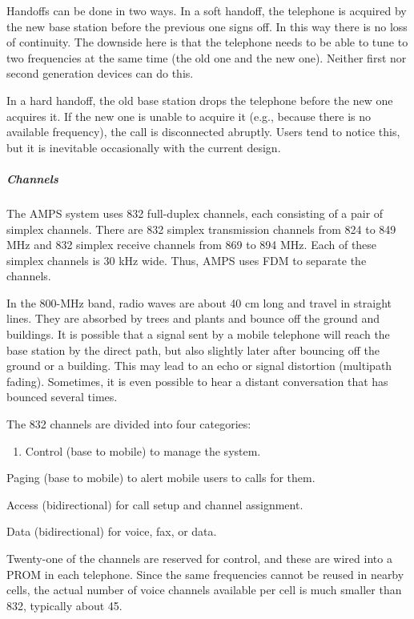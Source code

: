 Handoffs can be done in two ways. In a {soft handoff}, the telephone is
acquired by the new base station before the previous one signs off. In
this way there is no loss of continuity. The downside here is that the
telephone needs to be able to tune to two frequencies at the same time
(the old one and the new one). Neither first nor second generation
devices can do this.

In a {hard handoff}, the old base station drops the telephone before the
new one acquires it. If the new one is unable to acquire it (e.g.,
because there is no available frequency), the call is disconnected
abruptly. Users tend to notice this, but it is inevitable occasionally
with the current design.

\protect\hypertarget{0130661023_ch02lev1sec6.htmlux5cux23ch02lev3sec20}{}{}

\subparagraph{Channels}

The AMPS system uses 832 full-duplex channels, each consisting of a pair
of simplex channels. There are 832 simplex transmission channels from
824 to 849 MHz and 832 simplex receive channels from 869 to 894 MHz.
Each of these simplex channels is 30 kHz wide. Thus, AMPS uses FDM to
separate the channels.

In the 800-MHz band, radio waves are about 40 cm long and travel in
straight lines. They are absorbed by trees and plants and bounce off the
ground and buildings. It is possible that a signal sent by a mobile
telephone will reach the base station by the direct path, but also
slightly later after bouncing off the ground or a building. This may
lead to an echo or signal distortion (multipath fading). Sometimes, it
is even possible to hear a distant conversation that has bounced several
times.

The 832 channels are divided into four categories:

\begin{enumerate}
\def\labelenumi{\arabic{enumi}.}
\item
  {}

  Control (base to mobile) to manage the system.
\end{enumerate}

Paging (base to mobile) to alert mobile users to calls for them.

Access (bidirectional) for call setup and channel assignment.

Data (bidirectional) for voice, fax, or data.

Twenty-one of the channels are reserved for control, and these are wired
into a PROM in each telephone. Since the same frequencies cannot be
reused in nearby cells, the actual number of voice channels available
per cell is much smaller than 832, typically about 45.

